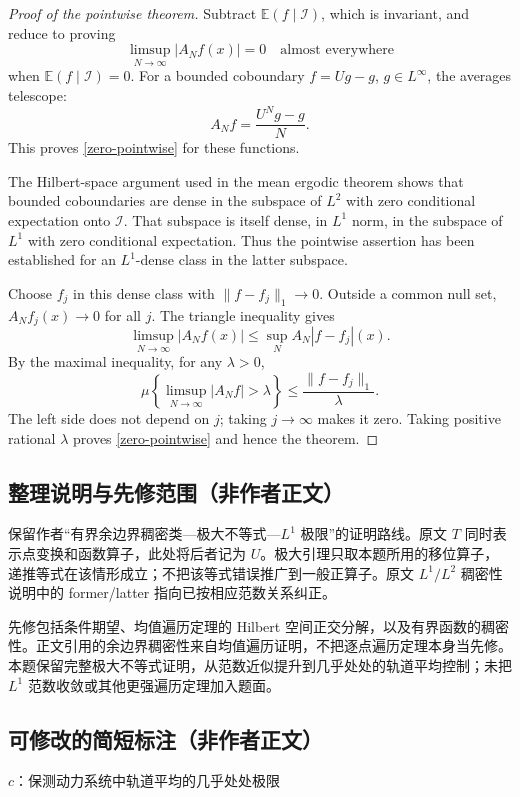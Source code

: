 \documentclass[UTF8,11pt]{ctexart}
\theoremstyle{definition}
\newcommand{\E}{\mathbb E}
\begin{document}
\begin{proof}[Proof of the pointwise theorem]
Subtract $\E(f\mid\mathcal I)$, which is invariant, and reduce to proving
\begin{equation}\label{zero-pointwise}
 \limsup_{N\to\infty}|A_Nf(x)|=0\quad\text{almost everywhere}
\end{equation}
when $\E(f\mid\mathcal I)=0$. For a bounded coboundary $f=Ug-g$,
$g\in L^\infty$, the averages telescope:
\[
 A_Nf=\frac{U^Ng-g}{N}.
\]
This proves \eqref{zero-pointwise} for these functions.

The Hilbert-space argument used in the mean ergodic theorem shows that
bounded coboundaries are dense in the subspace of $L^2$ with zero
conditional expectation onto $\mathcal I$. That subspace is itself dense,
in $L^1$ norm, in the subspace of $L^1$ with zero conditional expectation.
Thus the pointwise assertion has been established for an $L^1$-dense class
in the latter subspace.

Choose $f_j$ in this dense class with $\|f-f_j\|_1\to0$. Outside a common
null set, $A_Nf_j(x)\to0$ for all $j$. The triangle inequality gives
\[
 \limsup_{N\to\infty}|A_Nf(x)|
 \leq\sup_N A_N|f-f_j|(x).
\]
By the maximal inequality, for any $\lambda>0$,
\[
 \mu\left\{\limsup_{N\to\infty}|A_Nf|>\lambda\right\}
 \leq\frac{\|f-f_j\|_1}{\lambda}.
\]
The left side does not depend on $j$; taking $j\to\infty$ makes it zero.
Taking positive rational $\lambda$ proves \eqref{zero-pointwise} and hence
the theorem.
\end{proof}

\subsection*{整理说明与先修范围（非作者正文）}
保留作者“有界余边界稠密类—极大不等式—$L^1$ 极限”的证明路线。原文 $T$ 同时表示点变换和函数算子，此处将后者记为 $U$。极大引理只取本题所用的移位算子，递推等式在该情形成立；不把该等式错误推广到一般正算子。原文 $L^1/L^2$ 稠密性说明中的 former/latter 指向已按相应范数关系纠正。

先修包括条件期望、均值遍历定理的 Hilbert 空间正交分解，以及有界函数的稠密性。正文引用的余边界稠密性来自均值遍历证明，不把逐点遍历定理本身当先修。本题保留完整极大不等式证明，从范数近似提升到几乎处处的轨道平均控制；未把 $L^1$ 范数收敛或其他更强遍历定理加入题面。
\subsection*{可修改的简短标注（非作者正文）}
$c$：保测动力系统中轨道平均的几乎处处极限
\end{document}

